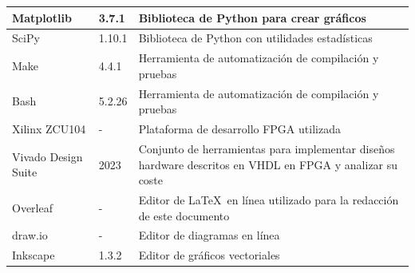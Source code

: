 \begin{center}
\begin{longtable}{|p{}|p{}|p{}|}
Matplotlib \cite{matplotlib}& 3.7.1                                                                                                                                        & Biblioteca de Python para crear gráficos\\\hline
SciPy \cite{scipy}& 1.10.1                                                                                                                                       & Biblioteca de Python con utilidades estadísticas\\\hline
Make                                    & 4.4.1                                                                                                                                        & Herramienta de automatización de compilación y pruebas                                                                                           \\\hline
Bash                                    & 5.2.26                                                                                                                                       & Herramienta de automatización de compilación y pruebas                                                                                           \\\hline
Xilinx ZCU104 \cite{fpga_board}& -                                                                                                                                            & Plataforma de desarrollo FPGA utilizada\\\hline
Vivado Design Suite \cite{vivado}& 2023                                                                                                                                         & Conjunto de herramientas para implementar diseños hardware descritos en VHDL en FPGA y analizar su coste                                         \\\hline
Overleaf \cite{overleaf}& -                                                                                                                                            & Editor de \LaTeX\ en línea utilizado para la redacción de este documento\\\hline
draw.io \cite{drawio}& -                                                                                                                                            & Editor de diagramas en línea                                                                                                                     \\\hline
Inkscape \cite{inkscape}& 1.3.2                                                                                                                                        & Editor de gráficos vectoriales \\\hline                                                                           
\end{longtable}
\end{center}

